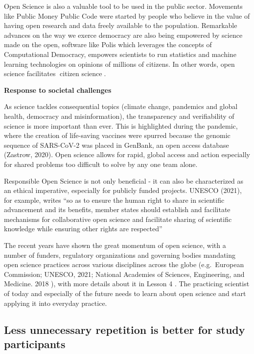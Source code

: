 \documentclass[
  letterpaper,
  DIV=11,
  numbers=noendperiod]{scrreport}
\begin{document}
Open Science is also a valuable tool to be used in the public sector.
Movements like Public Money Public Code were started by people who
believe in the value of having open research and data freely available
to the population. Remarkable advances on the way we exerce democracy
are also being empowered by science made on the open, software like
Polis which leverages the concepts of Computational Democracy, empowers
scientists to run statistics and machine learning technologies on
opinions of millions of citizens. In other words, open science
facilitates 📖citizen science📖.

\textbf{Response to societal challenges}

As science tackles consequential topics (climate change, pandemics and
global health, democracy and misinformation), the transparency and
verifiability of science is more important than ever. This is
highlighted during the pandemic, where the creation of life-saving
vaccines were spurred because the genomic sequence of SARS-CoV-2 was
placed in GenBank, an open access database (Zastrow, 2020). Open science
allows for rapid, global access and action especially for shared
problems too difficult to solve by any one team alone.

Responsible Open Science is not only beneficial - it can also be
characterized as an ethical imperative, especially for publicly funded
projects. UNESCO (2021), for example, writes
``\hspace{0pt}\hspace{0pt}so as to ensure the human right to share in
scientific advancement and its benefits, member states should establish
and facilitate mechanisms for collaborative open science and facilitate
sharing of scientific knowledge while ensuring other rights are
respected''

The recent years have shown the great momentum of open science, with a
number of funders, regulatory organizations and governing bodies
mandating open science practices across various disciplines across the
globe (e.g.~European Commission; UNESCO, 2021; National Academies of
Sciences, Engineering, and Medicine. 2018 ), with more details about it
in Lesson 4 . The practicing scientist of today and especially of the
future needs to learn about open science and start applying it into
everyday practice.

\hypertarget{less-unnecessary-repetition-is-better-for-study-participants}{%
\subsection{Less unnecessary repetition is better for study
participants}\label{less-unnecessary-repetition-is-better-for-study-participants}}
\end{document}
